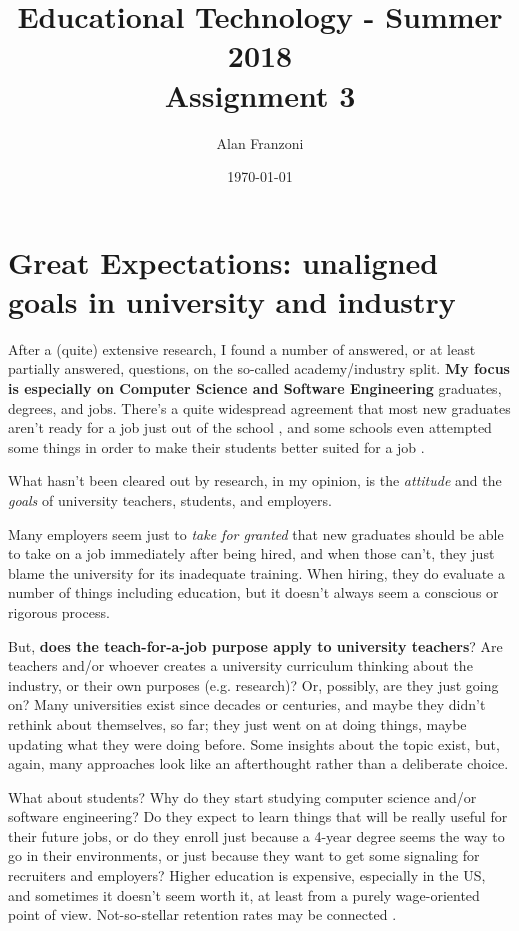 \documentclass[12pt,a4paper,titlepage]{article}
\title{\blue Educational Technology - Summer 2018 \\
\blueb Assignment 3}
\author{Alan Franzoni}
\date{\today}
\begin{document}
\maketitle

\section* {Great Expectations: unaligned goals in university and industry}

After a (quite) extensive research, I found a number of answered, or at least partially answered, questions, on the so-called academy/industry split. \textbf{My focus is especially on Computer Science and Software Engineering} graduates, degrees, and jobs. There's a quite widespread agreement that most new graduates aren't ready for a job just out of the school \cite{Chakrabarti2018} \cite{Smiley2016} , and some schools even attempted some things in order to make their students better suited for a job \cite{Delgado2017} \cite{Portela2017} \cite{Bastarrica2017} \cite{Dawson2000}  .\newline

What hasn't been cleared out by research, in my opinion, is the \textit{attitude} and the \textit{goals} of university teachers, students, and employers.\newline

 Many employers seem just to \textit{take for granted} that new graduates should be able to take on a job immediately after being hired, and when those can't, they just blame the university for its inadequate training. When hiring, they do evaluate a number of things \cite{Stasio2016} including education, but it doesn't always seem a conscious or rigorous process.\newline
 
 But, \textbf{does the teach-for-a-job purpose apply to university teachers}? Are teachers and/or whoever creates a university curriculum thinking about the industry, or their own purposes (e.g. research)? Or, possibly, are they just going on? Many universities exist since decades or centuries, and maybe they didn't rethink about themselves, so far; they just went on at doing things, maybe updating what they were doing before. Some insights about the topic \cite{Xia2017} exist, but, again, many approaches look like an afterthought rather than a deliberate choice.\newline
 
 What about students? Why do they start studying computer science and/or software engineering? Do they expect to learn things that will be really useful for their future jobs, or do they enroll just because a 4-year degree seems the way to go in their environments, or just because they want to get some signaling for recruiters and employers? Higher education is expensive, especially in the US, and sometimes \cite{SO2018} it doesn't seem worth it, at least from a purely wage-oriented point of view. Not-so-stellar retention rates may be connected \cite{Sithole2017} \cite{Beaubouef2005}. \newline
\end{document}
